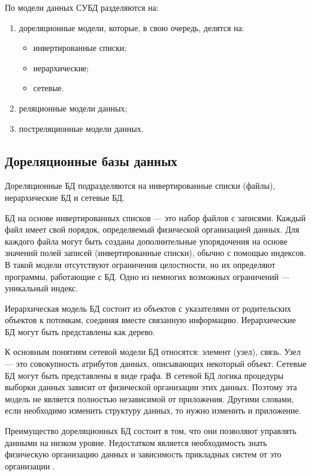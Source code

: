 По модели данных СУБД разделяются на:

\begin{enumerate}[label={\arabic*)}]
	\item дореляционные модели, которые, в свою очередь, делятся на:
	\begin{itemize}[label*=--]
		\item инвертированные списки;
		\item иерархические;
		\item сетевые.
	\end{itemize}
	
\clearpage

	\item реляционные модели данных;
	\item постреляционные модели данных.
\end{enumerate}

\subsection{Дореляционные базы данных}

Дореляционные БД подразделяются на инвертированные списки (файлы), иерархические БД и сетевые БД.

БД на основе инвертированных списков --- это набор файлов с записями. Каждый файл имеет свой порядок, определяемый физической организацией данных. Для каждого файла могут быть созданы дополнительные упорядочения на основе значений полей записей (инвертированные списки), обычно с помощью индексов. В такой модели отсутствуют ограничения целостности, но их определяют программы, работающие с БД. Одно из немногих возможных ограничений --- уникальный индекс.

Иерархическая модель БД состоит из объектов с указателями от родительских объектов к потомкам, соединяя вместе связанную информацию. Иерархические БД могут быть представлены как дерево. 

К основным понятиям сетевой модели БД относятся: элемент (узел), связь. Узел --- это совокупность атрибутов данных, описывающих некоторый объект. Сетевые БД могут быть представлены в виде графа. В сетевой БД логика процедуры выборки данных зависит от физической организации этих данных. Поэтому эта модель не является полностью независимой от приложения. Другими словами, если необходимо изменить структуру данных, то нужно изменить и приложение. 

Преимущество дореляционных БД состоит в том, что они позволяют управлять данными на низком уровне. Недостатком является необходимость знать физическую организацию данных и зависимость прикладных систем от это организации \cite{info_db_kuznecov}.

